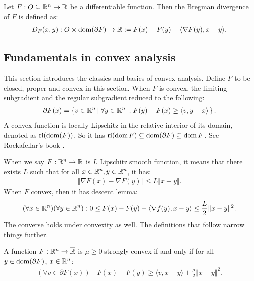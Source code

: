 \documentclass[12pt]{article}
\begin{document}
        \begin{definition}
            Let $F: O \subseteq \mathbb R^n \rightarrow \mathbb R$ be a differentiable function. 
            Then the Bregman divergence of $F$ is defined as: 
            \begin{align*}
                D_F(x, y): O \times \operatorname{dom}(\partial F) \rightarrow \mathbb R
                := F(x) - F(y) - \langle \nabla F(y), x - y\rangle. 
            \end{align*}
        \end{definition}
    
    \subsection{Fundamentals in convex analysis}
        This section introduces the classics and basics of convex analysis. 
        Define $F$ to be closed, proper and convex in this section. 
        When $F$ is convex, the limiting subgradient and the regular subgradient reduced to the following: 
        \begin{align*}
            \partial F(x) = \left\lbrace
                v \in \mathbb R^n \left|\; 
                    \forall y \in \mathbb R^n\; :  F(y) - F(x)  \ge \langle v, y - x\rangle
                \right.
            \right\rbrace. 
        \end{align*}
        A convex function is locally Lipschitz in the relative interior of its domain, denoted as $\operatorname{ri}(\operatorname{dom}(F))$. 
        So it has 
        $\operatorname{ri}(\operatorname{dom} F)\subseteq \operatorname{dom}(\partial F) \subseteq \operatorname{dom} F$.
        See Rockafellar's book \cite[pg 82]{rockafellar_convex_1997}. 
        \par
        When we say $F:\mathbb R^n \rightarrow \mathbb R$ is $L$ Lipschitz smooth function, it means that there exists $L$ such that for all $x\in \mathbb R^n, y \in \mathbb R^n$, it has: 
        \begin{align*}
            \Vert \nabla F(x) - \nabla F(y)\Vert \le L \Vert x - y\Vert. 
        \end{align*}
        When $F$ convex, then it has descent lemma: 
        \begin{align*}
            (\forall x \in \mathbb R^n)(\forall y \in \mathbb R^n): 0 \le 
            F(x) - F(y) - \langle \nabla f(y), x - y\rangle \le \frac{L}{2}\Vert x - y\Vert^2. 
        \end{align*}
        The converse holds under convexity as well. 
        The definitions that follow narrow things further. 
        \begin{definition}\label{def:s-cnvx}
            A function $F:\mathbb R^n \rightarrow \overline {\mathbb R}$ is $\mu \ge 0$ strongly convex if and only if for all $y \in \operatorname{dom}(\partial F)$, $x\in \mathbb R^n$: 
            \begin{align*}
                (\forall v \in \partial F(x))\quad 
                F(x) - F(y) \ge \langle v, x - y\rangle + \frac{\mu}{2}\Vert x - y\Vert^2. 
            \end{align*}
        \end{definition}
\end{document}
